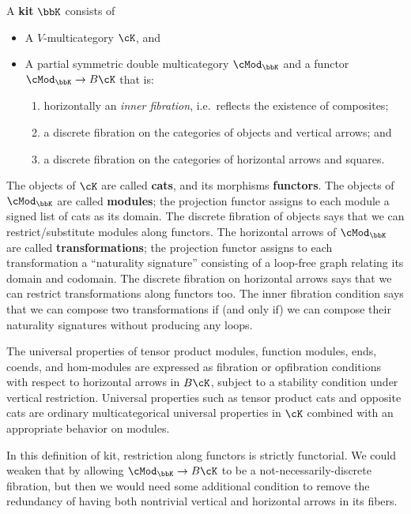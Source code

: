 \documentclass{amsart}
\newcommand{\K}{\bbK}
\let\mod\cMod
\def\modk{\mod_\K}
\begin{document}
\begin{defn}
  A \textbf{kit} $\K$ consists of
  \begin{itemize}
  \item A $V$-multicategory $\cK$, and
  \item A partial symmetric double multicategory $\modk$ and a functor $\modk \to B\cK$ that is:
    \begin{enumerate}
    \item horizontally an \emph{inner fibration}, i.e.\ reflects the existence of composites;
    \item a discrete fibration on the categories of objects and vertical arrows; and
    \item a discrete fibration on the categories of horizontal arrows and squares.
    \end{enumerate}
  \end{itemize}
\end{defn}

The objects of $\cK$ are called \textbf{cats}, and its morphisms \textbf{functors}.
The objects of $\modk$ are called \textbf{modules}; the projection functor assigns to each module a signed list of cats as its domain.
The discrete fibration of objects says that we can restrict/substitute modules along functors.
The horizontal arrows of $\modk$ are called \textbf{transformations}; the projection functor assigns to each transformation a ``naturality signature'' consisting of a loop-free graph relating its domain and codomain.
The discrete fibration on horizontal arrows says that we can restrict transformations along functors too.
The inner fibration condition says that we can compose two transformations if (and only if) we can compose their naturality signatures without producing any loops.

The universal properties of tensor product modules, function modules, ends, coends, and hom-modules are expressed as fibration or opfibration conditions with respect to horizontal arrows in $B\cK$, subject to a stability condition under vertical restriction.
Universal properties such as tensor product cats and opposite cats are ordinary multicategorical universal properties in $\cK$ combined with an appropriate behavior on modules.

In this definition of kit, restriction along functors is strictly functorial.
We could weaken that by allowing $\modk \to B\cK$ to be a not-necessarily-discrete fibration, but then we would need some additional condition to remove the redundancy of having both nontrivial vertical and horizontal arrows in its fibers.
\end{document}
